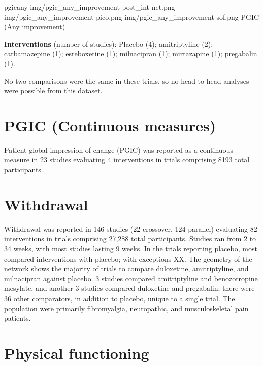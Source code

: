 \documentclass{report}\usepackage[]{graphicx}\usepackage[]{color}
\begin{document}
\soffignew
{pgicany}
{img/pgic_any_improvement-post_int-net.png}
{img/pgic_any_improvement-pico.png}
{img/pgic_any_improvement-sof.png}
{PGIC (Any improvement)}

\textbf{Interventions} (number of studies): Placebo (4); amitriptyline (2); carbamazepine (1); esreboxetine (1); milnacipran (1); mirtazapine (1); pregabalin (1).

No two comparisons were the same in these trials, so no head-to-head analyses were possible from this dataset.

\section{PGIC (Continuous measures)}

Patient global impression of change (PGIC) was reported as a continuous measure in 23 studies evaluating 4 interventions in trials comprising 8193 total participants.





\section{Withdrawal}

Withdrawal was reported in 146 studies (22 crossover, 124 parallel) evaluating 82 interventions in trials comprising 27,288 total participants. Studies ran from 2 to 34 weeks, with most studies lasting 9 weeks. In the trials reporting placebo, most compared interventions with placebo; with exceptions XX. The geometry of the network shows the majority of trials to compare duloxetine, amitriptyline, and milnacipran against placebo. 3 studies compared amitriptyline and benozotropine mesylate, and another 3 studies compared duloxetine and pregabalin; there were 36 other comparators, in addition to placebo, unique to a single trial. The population were primarily fibromyalgia, neuropathic, and musculoskeletal pain patients.




\section{Physical functioning}
\end{document}
